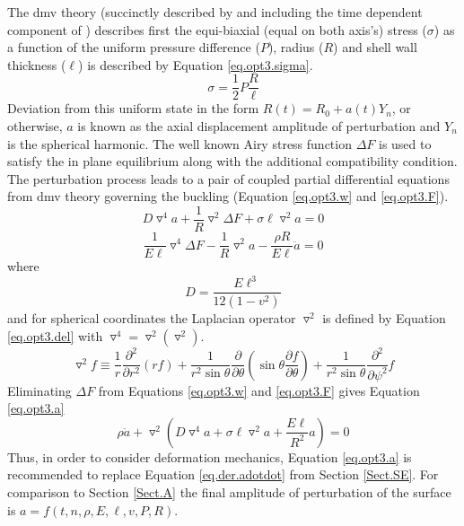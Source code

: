 The \ac{dmv} theory (succinctly described by \cite{Hutchinson2016} and including the time dependent component of \cite{Vassilev1997}) describes first the equi-biaxial (equal on both axis's) stress ($\sigma$) as a function of the uniform pressure difference ($P$), radius ($R$) and shell wall thickness
($\ell$) is described by Equation \ref{eq.opt3.sigma}.
\begin{equation} \label{eq.opt3.sigma}
\sigma = \frac{1}{2} P \frac{R}{\ell}
\end{equation}
\noindent Deviation from this uniform state in the form $R(t) = R_0 + a(t)Y_{n}$, or otherwise, $a$ is known as the axial displacement amplitude of perturbation and $Y_{n}$ is the spherical harmonic. The well known Airy stress function $\Delta F$ is used to satisfy the in plane equilibrium along with the additional compatibility condition.  The perturbation process leads to a pair of coupled partial differential equations from \ac{dmv} theory governing the buckling (Equation \ref{eq.opt3.w} and \ref{eq.opt3.F}).
\begin{equation} \label{eq.opt3.w}
D \triangledown^4 a + \frac{1}{R} \triangledown^2 \Delta F + \sigma \ell \triangledown^2 a = 0
\end{equation}
\begin{equation} \label{eq.opt3.F}
\frac{1}{E\ell} \triangledown^4 \Delta F - \frac{1}{R} \triangledown^2 a -\frac{\rho R}{E\ell} \ddot{a} = 0
\end{equation}
\noindent where
\begin{equation} \label{eq.opt3.D}
D = \frac{E\ell^3}{12(1-v^2)}
\end{equation}
\noindent and for spherical coordinates the Laplacian operator $\triangledown^2$ is defined by Equation \ref{eq.opt3.del} with $\triangledown^4 = \triangledown^2(\triangledown^2)$.
\begin{equation} \label{eq.opt3.del}
\triangledown^2f  \equiv \frac{1}{r}\frac{\partial^2}{\partial r^2} (rf) + \frac{1}{r^2 \sin \theta} \frac{\partial}{\partial \theta}\left( \sin \theta \frac{\partial f}{\partial \theta} \right) + \frac{1}{r^2\sin \theta} \frac{\partial^2}{\partial \psi^2}f
\end{equation}
\noindent Eliminating $\Delta F$ from Equations \ref{eq.opt3.w} and \ref{eq.opt3.F} gives Equation \ref{eq.opt3.a}
\begin{equation} \label{eq.opt3.a}
\rho \ddot{a} + \triangledown^2  \left( D \triangledown^4 a  + \sigma \ell \triangledown^2 a + \frac{E\ell}{R^2}a   \right) = 0
\end{equation}
\noindent Thus, in order to consider deformation mechanics,  Equation \ref{eq.opt3.a} is recommended to replace Equation \ref{eq.der.adotdot} from Section \ref{Sect.SE}. For comparison to Section \ref{Sect.A} the final amplitude of perturbation of the surface is $a = f(t, n, \rho, E, \ell, v, P, R)$.


